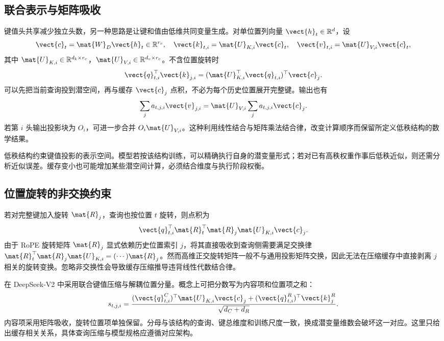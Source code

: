 \documentclass[../textbook.tex]{subfiles}
\begin{document}
\subsection{联合表示与矩阵吸收}
键值头共享减少独立头数，另一种思路是让键和值由低维共同变量生成。对单位置列向量 $\vect{h}_t\in\mathbb R^d$，设
\begin{equation}
 \vect{c}_t=\mat{W}_D\vect{h}_t\in\mathbb R^{r_c},\quad
 \vect{k}_{t,i}=\mat{U}_{K,i}\vect{c}_t,\quad \vect{v}_{t,i}=\mat{U}_{V,i}\vect{c}_t,
\end{equation}
其中 $\mat{U}_{K,i}\in\mathbb R^{d_k\times r_c}$，$\mat{U}_{V,i}\in\mathbb R^{d_v\times r_c}$。不含位置旋转时
\begin{equation}
 \vect{q}_{t,i}^{\top}\vect{k}_{j,i}=(\mat{U}_{K,i}^{\top}\vect{q}_{t,i})^{\top}\vect{c}_j.
 \label{eq:cache-absorb-key}
\end{equation}
可以先把当前查询投到潜空间，再与缓存 $\vect{c}_j$ 点积，不必为每个历史位置展开完整键。输出也有
\begin{equation}
 \sum_j a_{t,j,i}\vect{v}_{j,i}=\mat{U}_{V,i}\sum_j a_{t,j,i}\vect{c}_j.
\end{equation}
若第 $i$ 头输出投影块为 $O_i$，可进一步合并 $O_i\mat{U}_{V,i}$。这种利用线性结合与矩阵乘法结合律，改变计算顺序而保留所定义低秩结构的数学结果。

低秩结构约束键值投影的表示空间。模型若按该结构训练，可以精确执行自身的潜变量形式；若对已有高秩权重作事后低秩近似，则还需分析近似误差。缓存变小也可能增加某些潜空间计算，必须结合维度与执行阶段权衡。

\subsection{位置旋转的非交换约束}
若对完整键加入旋转 $\mat{R}_j$，查询也按位置 $t$ 旋转，则点积为
\begin{equation}
 \vect{q}_{t,i}^{\top}\mat{R}_t^{\top}\mat{R}_j\mat{U}_{K,i}\vect{c}_j.
\end{equation}
由于 RoPE 旋转矩阵 $\mat{R}_j$ 显式依赖历史位置索引 $j$，将其直接吸收到查询侧需要满足交换律 $\mat{R}_t^{\top}\mat{R}_j\mat{U}_{K,i} = (\cdots)\mat{R}_j$。然而高维正交旋转矩阵一般不与通用投影矩阵交换，因此无法在压缩缓存中直接剥离 $j$ 相关的旋转变换。忽略非交换性会导致缓存压缩推导违背线性代数结合律。

在 DeepSeek-V2 中采用联合键值压缩与解耦位置分量\cite{deepseek2024v2}。概念上可把分数写为内容项和位置项之和：
\begin{equation}
 s_{t,j,i}=\frac{(\vect{q}^C_{t,i})^\top \mat{U}_{K,i}\vect{c}_j+
 (\vect{q}^R_{t,i})^\top \vect{k}^R_j}{\sqrt{d_C+d_R}}.
 \label{eq:cache-mla}
\end{equation}
内容项采用矩阵吸收，旋转位置项单独保留。分母与该结构的查询、键总维度和训练尺度一致，换成潜变量维数会破坏这一对应。这里只给出缓存相关关系，具体查询压缩与模型规格应遵循对应架构。
\end{document}
